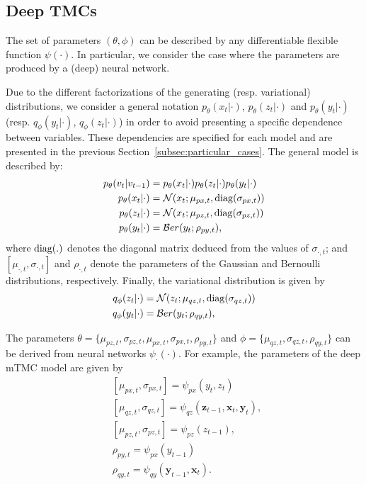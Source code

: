 \documentclass{article}
\def\x{{\mathbf x}}
\def\z{{\mathbf z}}
\def\y{{\mathbf y}}
\def\N{{\mathcal N}}
\def\Ber{{\mathcal Ber}}
\def\p{p_{\theta}}
\def\q{q_\phi}
\begin{document}
\subsection{Deep TMCs}
\label{subsec:deepTMC}
The set of parameters $(\theta, \phi)$  
can be described by any differentiable flexible function $\psi(\cdot)$. 
In particular, we consider the case where the parameters are
produced by a (deep) neural network. 

Due to the different factorizations of the generating (resp. variational)
distributions, we consider a general notation
$\p(x_t | \cdot)$, $\p(z_t| \cdot)$ and $\p(y_t | \cdot)$ 
(resp. $\q(y_t | \cdot)$, $\q(z_t | \cdot)$) 
in order to avoid presenting a specific dependence between variables. 
These dependencies are specified for each model and are presented in the previous
Section~\ref{subsec:particular_cases}.
The general model is described by:
\begin{align}
    \p(v_t|v_{t-1}) &=  \p(x_t|\cdot) \p(z_t|\cdot)\p(y_t|\cdot) \nonumber\\
\label{eq:px}
    \p(x_t | \cdot) &= \N(x_t; \mu_{px, t}, {\rm diag}(\sigma_{px,t}) ) \\
\label{eq:pz}
    \p(z_t | \cdot) &= \N(x_t; \mu_{pz, t}, {\rm diag}(\sigma_{pz,t}) ) \\
\label{eq:py}
    \p(y_t | \cdot) &= \Ber(y_t;  \rho_{py,t}) \text{,}
\end{align}
where ${\rm diag(.)}$ denotes the diagonal matrix deduced from the values 
of $\sigma_{\cdot,t}$; and  $[\mu_{\cdot,t}, \sigma_{\cdot,t}]$  and $\rho_{\cdot,t}$ denote 
the parameters of the Gaussian and Bernoulli distributions, respectively. 
Finally, the variational distribution is given by
\begin{align}
\label{eq:qz}
    \q(z_t | \cdot) &=  \N(z_t; \mu_{qz, t}, {\rm diag}(\sigma_{qz,t}) )\\  
\label{eq:qy}
    \q(y_t | \cdot) &=  \Ber(y_t;  \rho_{qy,t}) \text{,} 
\end{align}

The parameters $\theta = \{\mu_{pz,t}, \sigma_{pz,t}, \mu_{px,t}, \sigma_{px,t}, \rho_{py,t}\}$  
and $\phi = \{ \mu_{qz,t}, \sigma_{qz,t} , \rho_{qy,t}\}$ can be derived from 
neural networks $\psi_{\cdot}(\cdot)$.
For example, the parameters of the deep mTMC model are given by
\begin{align*}
    &[\mu_{px,t}, \sigma_{px,t}]  = \psi_{px}(y_t, z_t)\\
    &[\mu_{qz,t}, \sigma_{qz,t}] = \psi_{qz}( \z_{t-1},\x_t, \y_t )\text{, }\\
    &[\mu_{pz,t}, \sigma_{pz,t}]  = \psi_{pz }(z_{t-1}), \\
    &\rho_{py,t}  = \psi_{px}(y_{t-1})\\
    &\rho_{qy,t}  = \psi_{qy}(\y_{t-1}, \x_t) \text{.}
\end{align*}
\end{document}

